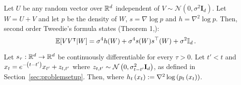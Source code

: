Let $U$ be any random vector over $\mathbb{R}^d$ independent of $V \sim \mathcal{N}(0,\sigma^2\mathbf{I}_d)$. Let $W = U+V$ and let $p$ be the density of $W$, $s = \nabla \log p$ and $h = \nabla^2 \log p$. Then, second order Tweedie's formula states (Theorem 1,\cite{meng2021estimating}):
$$ \mathbb{E}[VV^{\intercal}|W] = \sigma^4 h(W) + \sigma^4 s(W)s^{\top}(W) + \sigma^2 \mathbb{I}_d\,.$$
\begin{lemma}\label{lemma:second_order_tweedie_application} Let $s_\tau:\mathbb{R}^d \to \mathbb{R}^d$ be continuously differentiable for every $\tau > 0$. Let $t' < t$ and $x_{t} = e^{-\left(t-t'\right)}x_{t'} + z_{t,t'}$ where $z_{t,t'} \sim \mathcal{N}\left(0, \sigma_{t-t'}^{2}\mathbf{I}_{d}\right)$, as defined in Section~\ref{sec:problemsetup}. Then, 
    where $h_{t}\left(x_{t}\right) := \nabla^{2}\log\left(p_{t}\left(x_t\right)\right)$.
\end{lemma}
